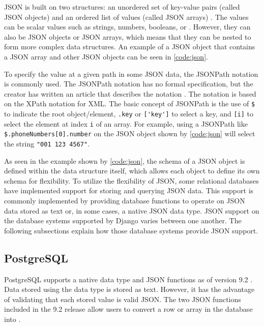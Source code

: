 \noindent
\begin{minipage}{\linewidth}

\end{minipage}

JSON is built on two structures: an unordered set of key-value pairs (called
JSON objects) and an ordered list of values (called JSON arrays)
\cite{json:org}. The values can be scalar values such as strings, numbers,
booleans, or . However, they can also be JSON objects or JSON
arrays, which means that they can be nested to form more complex data
structures. An example of a JSON object that contains a JSON array and other
JSON objects can be seen in \autoref{code:json}.

To specify the value at a given path in some JSON data, the JSONPath notation
is commonly used. The JSONPath notation has no formal specification, but the
creator has written an article that describes the notation
\cite{goessner:jsonpath}. The notation is based on the XPath notation for XML.
The basic concept of JSONPath is the use of \verb|$| to indicate the root
object/element, \verb|.key| or \verb|['key']| to select a key, and \verb|[i]|
to select the element at index \verb|i| of an array. For example, using a
JSONPath like \verb|$.phoneNumbers[0].number| on the JSON object shown by
\autoref{code:json} will select the string \verb|"001 123 4567"|.

As seen in the example shown by \autoref{code:json}, the schema of a JSON
object is defined within the data structure itself, which allows each object to
define its own schema for flexibility. To utilize the flexibility of JSON, some
relational databases have implemented support for storing and querying JSON
data. This support is commonly implemented by providing database functions to
operate on JSON data stored as text or, in some cases, a native JSON data type.
JSON support on the database systems supported by Django varies between one
another. The following subsections explain how those database systems provide
JSON support.

\subsection{PostgreSQL}

PostgreSQL supports a native  data type and JSON functions as of
version 9.2 \cite{postgresql:9.2}. Data stored using the  data type
is stored as text. However, it has the advantage of validating that each stored
value is valid JSON. The two JSON functions included in the 9.2 release allow
users to convert a row or array in the database into .

